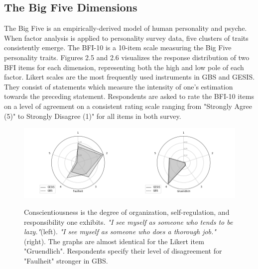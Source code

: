 \subsection{The Big Five Dimensions}

The Big Five is an empirically-derived model of human personality and psyche. When factor analysis is applied to personality survey data, five clusters of traits consistently emerge. The BFI-10 is a 10-item scale measuring the Big Five personality traits. Figures 2.5 and 2.6 visualizes the response distribution of two BFI items for each dimension, representing both the high and low pole of each factor. Likert scales are the most frequently used instruments in GBS and GESIS. They consist of statements which measure the intensity of one's estimation towards the preceding statement. Respondents are asked to rate the BFI-10 items on a level of agreement on a consistent rating scale ranging from "Strongly Agree (5)" to Strongly Disagree (1)" for all items in both survey. 

\begin{figure}[H]
	\begin{center}
		\includegraphics[scale=0.52,angle=0]{fig/Conscientiousness_figure}
		\label{Conscientiousness}
		\caption{Conscientiousness is the degree of organization, self-regulation, and responsibility one exhibits. \textit{"I see myself as someone who tends to be lazy."}(left). \textit{"I see myself as someone who does a thorough job."}(right). The graphs are almost identical for the Likert item "Gruendlich". Respondents specify their level of disagreement for "Faulheit" stronger in GBS.}
	\end{center}
\end{figure}

